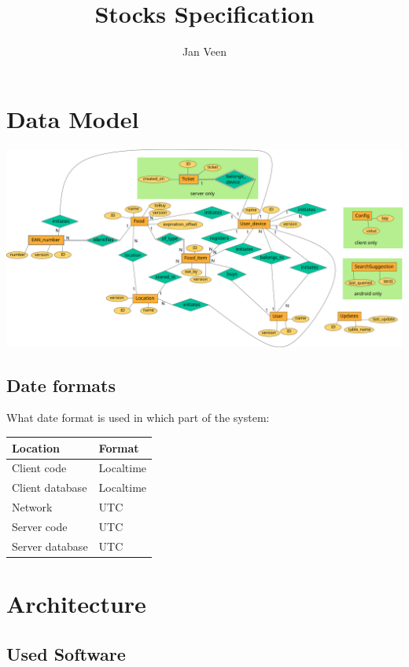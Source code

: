 \documentclass[12pt]{report}
\begin{document}
\title{Stocks Specification}			%
\author{Jan Veen}
\maketitle				%
\cleardoublepage
{}
\tableofcontents

\chapter{Data Model}

\includegraphics[width=\linewidth]{diagrams/ER-diagram.png}

\section{Date formats}
What date format is used in which part of the system:

\begin{tabular}{l l}
Location & Format \\\hline
Client code & Localtime \\\hline
Client database & Localtime \\\hline
Network & UTC \\\hline
Server code & UTC \\\hline
Server database & UTC \\\hline
\end{tabular}

\chapter{Architecture}

\section{Used Software}
\end{document}

